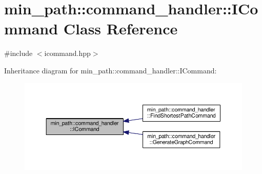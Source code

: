 \hypertarget{classmin__path_1_1command__handler_1_1_i_command}{}\section{min\+\_\+path\+:\+:command\+\_\+handler\+:\+:I\+Command Class Reference}
\label{classmin__path_1_1command__handler_1_1_i_command}


{\ttfamily \#include $<$icommand.\+hpp$>$}



Inheritance diagram for min\+\_\+path\+:\+:command\+\_\+handler\+:\+:I\+Command\+:
\nopagebreak
\begin{figure}[H]
\begin{center}
\leavevmode
\includegraphics[width=350pt]{classmin__path_1_1command__handler_1_1_i_command__inherit__graph}
\end{center}
\end{figure}
